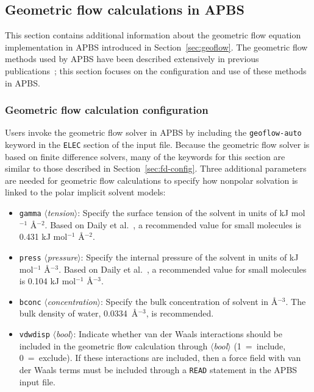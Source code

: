 \documentclass[12pt,titlepage]{article}
\newcommand{\keyword}[1]{\texttt{#1}}
\newcommand{\param}[1]{$\langle$\textit{#1}$\rangle$}
\begin{document}
\subsection{Geometric flow calculations in APBS} \label{app:geoflow}
This section contains additional information about the geometric flow equation implementation in APBS introduced in Section~\ref{sec:geoflow}.
The geometric flow methods used by APBS have been described extensively in previous publications~\cite{Chen2010, Chen2011, Chen2012, Daily2013, Thomas2013a}; this section focuses on the configuration and use of these methods in APBS.

\subsubsection{Geometric flow calculation configuration}
Users invoke the geometric flow solver in APBS by including the \keyword{geoflow-auto} keyword in the \keyword{ELEC} section of the input file.
Because the geometric flow solver is based on finite difference solvers, many of the keywords for this section are similar to those described in Section~\ref{sec:fd-config}.
Three additional parameters are needed for geometric flow calculations to specify how nonpolar solvation is linked to the polar implicit solvent models:
\begin{itemize}
	\item \keyword{gamma} \param{tension}:  Specify the surface tension of the solvent in units of kJ mol$^{-1}$ \AA$^{-2}$.
	Based on Daily et al.~\cite{Daily2013}, a recommended value for small molecules is 0.431 kJ mol$^{-1}$ \AA$^{-2}$.
	\item \keyword{press} \param{pressure}:  Specify the internal pressure of the solvent in units of kJ mol$^{-1}$ \AA$^{-3}$.
	Based on Daily et al.~\cite{Daily2013}, a recommended value for small molecules is 0.104 kJ mol$^{-1}$ \AA$^{-3}$.
	\item \keyword{bconc} \param{concentration}:  Specify the bulk concentration of solvent in \AA$^{-3}$.
	The bulk density of water, 0.0334~\AA$^{-3}$, is recommended.
	\item \keyword{vdwdisp} \param{bool}:  Indicate whether van der Waals interactions should be included in the geometric flow calculation through \param{bool} (1~=~include, 0~=~exclude).
	If these interactions are included, then a force field with van der Waals terms must be included through a \keyword{READ} statement in the APBS input file.
\end{itemize}
\end{document}
